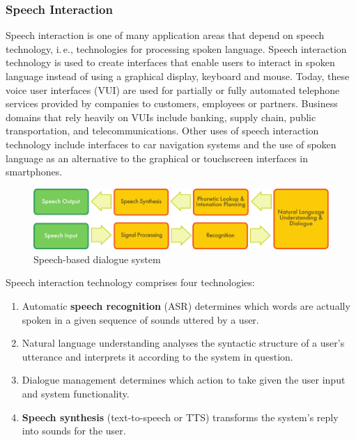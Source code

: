 \documentclass[]{../../metanetpaper}
\begin{document}
\begin{multicols}{2}
\subsubsection{Speech Interaction}

Speech interaction is one of many application areas that depend on speech technology, i.\,e., technologies for processing spoken language. Speech interaction technology is used to create interfaces that enable users to interact in spoken language instead of using a graphical display, keyboard and mouse.  Today, these voice user interfaces (VUI) are used for partially or fully automated telephone services provided by companies to customers, employees or partners. Business domains that rely heavily on VUIs include banking, supply chain, public transportation, and telecommunications. Other uses of speech interaction technology include interfaces to car navigation systems and the use of spoken language as an alternative to the graphical or touchscreen interfaces in smartphones.

\begin{figure}[htb]
  \center
  \includegraphics[width=\textwidth]{../_media/english/simple_speech-based_dialogue_architecture}
  \caption{Speech-based dialogue system}
  \label{fig:dialoguearch_en}
\end{figure}

Speech interaction technology comprises four technologies: 

\begin{enumerate}
\item Automatic \textbf{speech recognition} (ASR) determines which words are actually spoken in a given sequence of sounds uttered by a user.  
\item Natural language understanding analyses the syntactic structure of a user’s utterance and interprets it according to the system in question.
\item Dialogue management determines which action to take given the user input and system functionality.   
\item \textbf{Speech synthesis} (text-to-speech or TTS) transforms the system’s reply into sounds for the user.
\end{enumerate}


\end{multicols}
\end{document}
